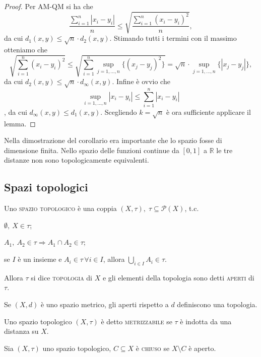 \documentclass{article}
\begin{document}
\begin{proof}
Per AM-QM si ha che
$$\displaystyle \frac{\sum_{i=1}^n |x_i-y_i|}{n} \le \sqrt{\frac{\sum_{i=1}^n
(x_i-y_i)^2}{n}},$$
da cui $d_1(x, y) \le \sqrt{n} \cdot d_2(x, y)$. Stimando tutti i termini con il
massimo otteniamo che
$$\displaystyle \sqrt{\sum_{i=1}^n (x_i-y_i)^2} \le
\sqrt{\sum_{i=1}^n \sup_{j=1, \dots, n} \{(x_j-y_j)^2\}}=\sqrt{n} \cdot
\sup_{j=1, \dots, n} \{ |x_j-y_j| \},$$
da cui
$d_2(x, y) \le \sqrt{n} \cdot d_{\infty} (x, y).$
 Infine è ovvio che
 $$\displaystyle \sup_{i=1, \dots, n} |x_i-y_i| \le
 \sum_{i=1}^n |x_i-y_i|$$, da cui $d_{\infty}(x, y) \le d_1(x, y).$
Scegliendo $k=\sqrt{n}$ è ora sufficiente applicare il lemma.
\end{proof}

Nella dimostrazione del corollario era importante che lo spazio fosse di
dimensione finita. Nello spazio delle funzioni continue da $[0, 1]$ a
$\mathbb{R}$ le tre distanze non sono topologicamente equivalenti.

\subsection{Spazi topologici}

\begin{defn}
Uno \textsc{spazio topologico} è una coppia $(X, \tau),\; {\tau \subseteq
\mathcal{P}(X)}$, t.c.
\begin{nlist}
\item $\emptyset,\ X \in \tau$;
\item $A_1,\ A_2 \in \tau \Rightarrow A_1 \cap A_2 \in \tau$;
\item se $I$ è un insieme e $A_i \in \tau \, \forall i \in I$, allora
$\displaystyle \bigcup_{i \in I} A_i \in \tau$.
\end{nlist}
Allora $\tau$ si dice \textsc{topologia} di $X$ e gli elementi della topologia
sono detti \textsc{aperti} di $\tau$.
\end{defn}

\begin{prop}
Se $(X, d)$ è uno spazio metrico, gli aperti rispetto a $d$ definiscono una
topologia.
\end{prop}

\begin{defn}
Uno spazio topologico $(X, \tau)$ è detto \textsc{metrizzabile} se $\tau$ è
indotta da una distanza su $X$.
\end{defn}

\begin{defn}
Sia $(X, \tau)$ uno spazio topologico, $C \subseteq X$ è \textsc{chiuso} se $X
\setminus C$ è aperto.
\end{defn}
\end{document}
